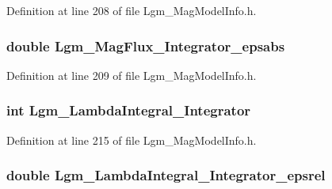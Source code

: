 Definition at line 208 of file Lgm\_\-MagModelInfo.h.\hypertarget{struct_lgm___mag_model_info_2659eea0c59fae87e7ac738542e00128}{
\subsubsection[{Lgm\_\-MagFlux\_\-Integrator\_\-epsabs}]{\setlength{\rightskip}{0pt plus 5cm}double {\bf Lgm\_\-MagFlux\_\-Integrator\_\-epsabs}}}
\label{struct_lgm___mag_model_info_2659eea0c59fae87e7ac738542e00128}




Definition at line 209 of file Lgm\_\-MagModelInfo.h.\hypertarget{struct_lgm___mag_model_info_a3ec6fe0176592c49bb9f25f9fd05a71}{
\subsubsection[{Lgm\_\-LambdaIntegral\_\-Integrator}]{\setlength{\rightskip}{0pt plus 5cm}int {\bf Lgm\_\-LambdaIntegral\_\-Integrator}}}
\label{struct_lgm___mag_model_info_a3ec6fe0176592c49bb9f25f9fd05a71}




Definition at line 215 of file Lgm\_\-MagModelInfo.h.\hypertarget{struct_lgm___mag_model_info_c2e550303cccbc0f08c3d46975f79111}{
\subsubsection[{Lgm\_\-LambdaIntegral\_\-Integrator\_\-epsrel}]{\setlength{\rightskip}{0pt plus 5cm}double {\bf Lgm\_\-LambdaIntegral\_\-Integrator\_\-epsrel}}}
\label{struct_lgm___mag_model_info_c2e550303cccbc0f08c3d46975f79111}




